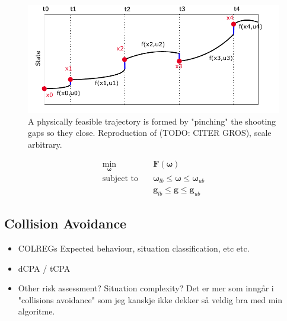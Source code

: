 \begin{figure}
    \label{FIG: Shooting Gaps}
    \includegraphics[width=\textwidth]{Images/MultipleShooting.pdf}
    \caption{A physically feasible trajectory is formed by "pinching" the shooting gaps so they close. Reproduction of (TODO: CITER GROS), scale arbitrary.}
\end{figure}

\begin{subequations}
    \label{EQ:NLP}
    \begin{align}
        \min_{\boldsymbol{\omega}} \quad & \textbf{F}(\boldsymbol{\omega}) \label{eq:NLP-1} \\
        \textrm{subject to} \quad & \boldsymbol{\omega}_{lb} \leq \boldsymbol{\omega} \leq \boldsymbol{\omega}_{ub} \\ 
        \quad & \textbf{g}_{lb} \leq \textbf{g} \leq \textbf{g}_{ub}
    \end{align}
\end{subequations}


\subsection{Collision Avoidance}
\begin{itemize}
    \item \gls{COLREGs}
    \subitem Expected behaviour, situation classification, etc etc.
    \item \gls{dCPA} / \gls{tCPA}
    \item Other risk assessment? Situation complexity? Det er mer som inngår i "collisions avoidance" som jeg kanskje ikke dekker så veldig bra med min algoritme.
\end{itemize}

